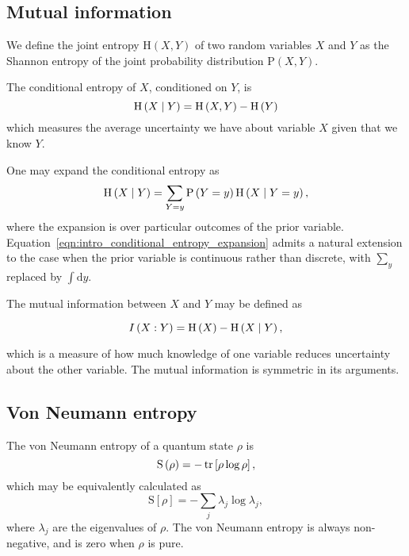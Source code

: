 \FloatBarrier
\subsection{Mutual information}
We define the joint entropy $\text{H}\left(X, Y\right)$ of two random variables $X$ and $Y$ as the Shannon entropy of the joint probability distribution $\text{P}\left(X, Y\right)$. 

The conditional entropy of $X$, conditioned on $Y$, is
\begin{equation}\label{eqn:intro_definition_conditional_entropy}
\text{H}\left(X \; \middle| \; Y\right) = \text{H}\left(X, Y\right) - \text{H}\left(Y\right)
\end{equation}
which measures the average uncertainty we have about variable $X$ given that we know $Y$.

One may expand the conditional entropy as \cite{Wilde2013}
\begin{equation}\label{eqn:intro_conditional_entropy_expansion}
\text{H}\left(X \; \middle| \; Y\right) = \sum_{Y=y} \text{P}\left(Y=y\right) \text{H}\left( X \; \middle| \; Y=y \right),
\end{equation}
where the expansion is over particular outcomes of the prior variable. Equation~\ref{eqn:intro_conditional_entropy_expansion} admits a natural extension to the case when the prior variable is continuous rather than discrete, with $\sum_{y}$ replaced by $\int \mathrm{d}y$.


The mutual information between $X$ and $Y$ may be defined as

\begin{equation}\label{eqn:intro_mutual_information}
I\left(X : Y\right) = \text{H}\left(X\right) - \text{H}\left(X \; \middle| \; Y\right),
\end{equation}

\noindent which is a measure of how much knowledge of one variable reduces uncertainty about the other variable. The mutual information is symmetric in its arguments.


\FloatBarrier
\subsection{Von Neumann entropy}
The von Neumann entropy of a quantum state $\rho$ is
\begin{equation}
\text{S}\left(\rho\right) = - \tr\left[\rho \log \rho \right],
\end{equation}
which may be equivalently calculated as
\begin{equation}\label{eqn:intro_von_neumann}
\text{S}\left[\rho\right] = - \sum_j \lambda_j \log \lambda_j,
\end{equation}
where $\lambda_j$ are the eigenvalues of $\rho$. The von Neumann entropy is always non-negative, and is zero when $\rho$ is pure.

